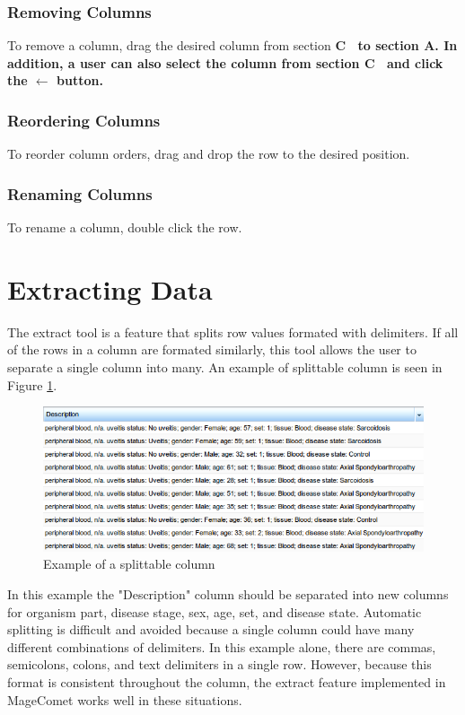 \documentclass[a4paper]{article}
\begin{document}
\subsubsection*{Removing Columns}
To remove a column, drag the desired column from section \bf{C}\rm~ to section \bf{A}\rm. In addition, a user can also select the column from section \bf{C}\rm~ and click the $\leftarrow$ button.
\subsubsection*{Reordering Columns}
To reorder column orders, drag and drop the row to the desired position.
\subsubsection*{Renaming Columns}
To rename a column, double click the row.
\section{Extracting Data}
The extract tool is a feature that splits row values formated with delimiters. If all of the rows in a column are formated similarly, this tool allows the user to separate a single column into many. An example of splittable column is seen in Figure \ref{splittable}. 

\begin{figure}[h]
\caption{Example of a splittable column}
\centering
\label{splittable}
\includegraphics[width=15cm]{images/splittable}
\end{figure}

In this example the "Description" column should be separated into new columns for organism part, disease stage, sex, age, set, and disease state. Automatic splitting is difficult and avoided because a single column could have many different combinations of delimiters. In this example alone, there are commas, semicolons, colons, and text delimiters in a single row. However, because this format is consistent throughout the column, the extract feature implemented in MageComet works well in these situations.
\end{document}
